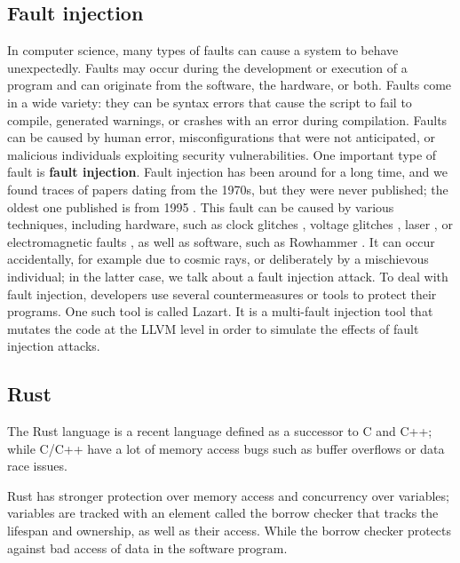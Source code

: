 \subsection{Fault injection}
In computer science, many types of faults can cause a system to behave unexpectedly.
Faults may occur during the development or execution of a program and can originate from the software, the hardware, or both.
Faults come in a wide variety: they can be syntax errors that cause the script to fail to compile, generated warnings, or crashes with an error during compilation.
Faults can be caused by human error, misconfigurations that were not anticipated, or malicious individuals exploiting security vulnerabilities.
One important type of fault is \textbf{fault injection}.
Fault injection has been around for a long time, and we found traces of papers dating from the 1970s, but they were never published; the oldest one published is from 1995 \cite{1_Segall1995}.
This fault can be caused by various techniques, including hardware, such as clock glitches \cite{15obermaier2017fuzzy,16korak2014effects}, voltage glitches \cite{11zussa2012investigation, 12zussa2014analysis, 13selmane2011security}, laser \cite{17selmke2016precise, 18dutertre2018laser}, or electromagnetic faults \cite{19dehbaoui2012injection, 20dehbaoui2012electromagnetic}, as well as software, such as Rowhammer \cite{14kim2014flipping}.
It can occur accidentally, for example due to cosmic rays, or deliberately by a mischievous individual; in the latter case, we talk about a fault injection attack.
To deal with fault injection, developers use several countermeasures \cite{dureuil2016,liu2025,Richter-Brockmann2021} or tools \cite{Arlat1990,Arribas2020,1_Segall1995,pensec2024} to protect their programs.
One such tool is called Lazart\cite{Lazart2015}. It is a multi-fault injection tool that mutates the code at the LLVM level in order to simulate the effects of fault injection attacks.

\subsection{Rust}

The Rust language is a recent language defined as a successor to C and C++;
while C/C++ have a lot of memory access bugs such as buffer overflows or data race issues.

Rust has stronger protection over memory access and concurrency over variables; variables are tracked with an element called the borrow checker that tracks the lifespan and ownership, as well as their access.
While the borrow checker protects against bad access of data in the software program. 

